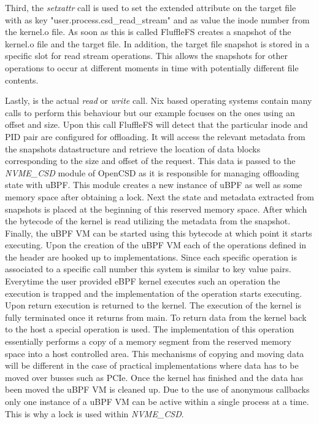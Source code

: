 Third, the \textit{setxattr} call is used to set the extended attribute on the
target file with as key "user.process.csd\_read\_stream" and as value the inode
number from the kernel.o file. As soon as this is called FluffleFS creates a
snapshot of the kernel.o file and the target file. In addition, the target file
snapshot is stored in a specific slot for read stream operations. This allows
the snapshots for other operations to occur at different moments in time with
potentially different file contents.

Lastly, is the actual \textit{read} or \textit{write} call. Nix based operating
systems contain many calls to perform this behaviour but our example focuses
on the ones using an offset and size. Upon this call FluffleFS will detect that
the particular inode and PID pair are configured for offloading. It will access
the relevant metadata from the snapshots datastructure and retrieve the
location of data blocks corresponding to the size and offset of the request.
This data is passed to the \textit{NVME\_CSD} module of OpenCSD as it is
responsible for managing offloading state with uBPF. This module creates a new
instance of uBPF as well as some memory space after obtaining a lock. Next the
state and metadata extracted from snapshots is placed at the beginning of this
reserved memory space. After which the bytecode of the kernel is read utilizing
the metadata from the snapshot. Finally, the uBPF VM can be started using this
bytecode at which point it starts executing. Upon the creation of the uBPF VM
each of the operations defined in the header are hooked up to implementations.
Since each specific operation is associated to a specific call number this
system is similar to key value pairs. Everytime the user provided eBPF kernel
executes such an operation the execution is trapped and the implementation of
the operation starts executing. Upon return execution is returned to the kernel.
The execution of the kernel is fully terminated once it returns from main. To
return data from the kernel back to the host a special operation is used. The
implementation of this operation essentially performs a copy of a memory segment
from the reserved memory space into a host controlled area. This mechanisms of
copying and moving data will be different in the case of practical
implementations where data has to be moved over busses such as PCIe. Once the
kernel has finished and the data has been moved the uBPF VM is cleaned up. Due
to the use of anonymous callbacks only one instance of a uBPF VM can be active
within a single process at a time. This is why a lock is used within
\textit{NVME\_CSD}.

